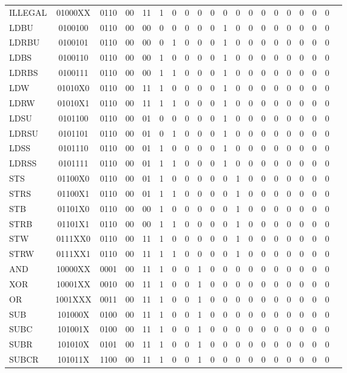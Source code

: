\documentclass[
	article,			%
	11pt,				%
	oneside,			%
	a4paper,			%
	english,			%
	brazil,				%
	sumario=tradicional
	]{abntex2}
\begin{document}
\begin{table}[!htp]
\begin{tabular}{lccccccccccccccccccc}
ILLEGAL &01000XX &0110 &00 &11 &1 &0 &0 &0 &0 &0 &0 &0 &0 &0 &0 &0 &0 &0 \\
LDBU &0100100 &0110 &00 &00 &0 &0 &0 &0 &0 &1 &0 &0 &0 &0 &0 &0 &0 &0 \\
LDRBU &0100101 &0110 &00 &00 &0 &1 &0 &0 &0 &1 &0 &0 &0 &0 &0 &0 &0 &0 \\
LDBS &0100110 &0110 &00 &00 &1 &0 &0 &0 &0 &1 &0 &0 &0 &0 &0 &0 &0 &0 \\
LDRBS &0100111 &0110 &00 &00 &1 &1 &0 &0 &0 &1 &0 &0 &0 &0 &0 &0 &0 &0 \\
LDW &01010X0 &0110 &00 &11 &1 &0 &0 &0 &0 &1 &0 &0 &0 &0 &0 &0 &0 &0 \\
LDRW &01010X1 &0110 &00 &11 &1 &1 &0 &0 &0 &1 &0 &0 &0 &0 &0 &0 &0 &0 \\
LDSU &0101100 &0110 &00 &01 &0 &0 &0 &0 &0 &1 &0 &0 &0 &0 &0 &0 &0 &0 \\
LDRSU &0101101 &0110 &00 &01 &0 &1 &0 &0 &0 &1 &0 &0 &0 &0 &0 &0 &0 &0 \\
LDSS &0101110 &0110 &00 &01 &1 &0 &0 &0 &0 &1 &0 &0 &0 &0 &0 &0 &0 &0 \\
LDRSS &0101111 &0110 &00 &01 &1 &1 &0 &0 &0 &1 &0 &0 &0 &0 &0 &0 &0 &0 \\
STS &01100X0 &0110 &00 &01 &1 &0 &0 &0 &0 &0 &1 &0 &0 &0 &0 &0 &0 &0 \\
STRS &01100X1 &0110 &00 &01 &1 &1 &0 &0 &0 &0 &1 &0 &0 &0 &0 &0 &0 &0 \\
STB &01101X0 &0110 &00 &00 &1 &0 &0 &0 &0 &0 &1 &0 &0 &0 &0 &0 &0 &0 \\
STRB &01101X1 &0110 &00 &00 &1 &1 &0 &0 &0 &0 &1 &0 &0 &0 &0 &0 &0 &0 \\
STW &0111XX0 &0110 &00 &11 &1 &0 &0 &0 &0 &0 &1 &0 &0 &0 &0 &0 &0 &0 \\
STRW &0111XX1 &0110 &00 &11 &1 &1 &0 &0 &0 &0 &1 &0 &0 &0 &0 &0 &0 &0 \\
AND &10000XX &0001 &00 &11 &1 &0 &0 &1 &0 &0 &0 &0 &0 &0 &0 &0 &0 &0 \\
XOR &10001XX &0010 &00 &11 &1 &0 &0 &1 &0 &0 &0 &0 &0 &0 &0 &0 &0 &0 \\
OR &1001XXX &0011 &00 &11 &1 &0 &0 &1 &0 &0 &0 &0 &0 &0 &0 &0 &0 &0 \\
SUB &101000X &0100 &00 &11 &1 &0 &0 &1 &0 &0 &0 &0 &0 &0 &0 &0 &0 &0 \\
SUBC &101001X &0100 &00 &11 &1 &0 &0 &1 &0 &0 &0 &0 &0 &0 &0 &0 &0 &0 \\
SUBR &101010X &0101 &00 &11 &1 &0 &0 &1 &0 &0 &0 &0 &0 &0 &0 &0 &0 &0 \\
SUBCR &101011X &1100 &00 &11 &1 &0 &0 &1 &0 &0 &0 &0 &0 &0 &0 &0 &0 &0 \\

\end{tabular}
\end{table}
\end{document}
